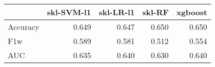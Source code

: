 \begin{tabular}{lrrrr}
\toprule
{} &  skl-SVM-l1 &  skl-LR-l1 &  skl-RF &  xgboost \\
\midrule
Accuracy &       0.649 &      0.647 &   0.650 &    0.650 \\
F1w      &       0.589 &      0.581 &   0.512 &    0.554 \\
AUC      &       0.635 &      0.640 &   0.630 &    0.640 \\
\bottomrule
\end{tabular}
